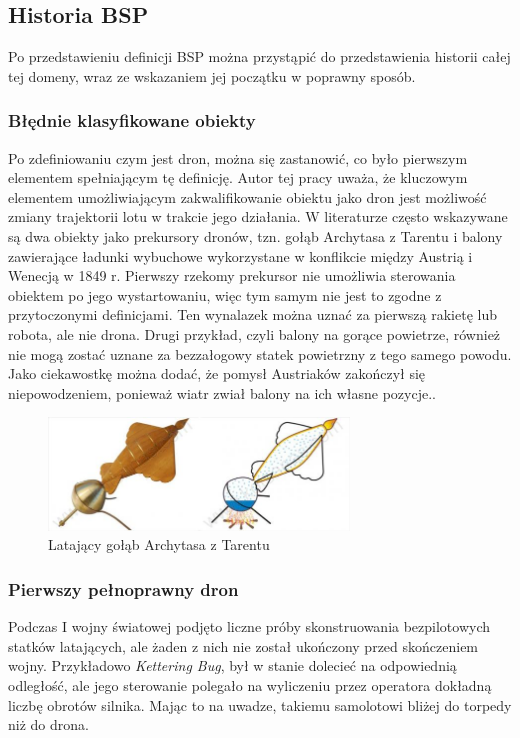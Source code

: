 \subsection{Historia BSP}
Po przedstawieniu definicji BSP można przystąpić do przedstawienia historii całej tej domeny, wraz ze wskazaniem jej początku w poprawny sposób.

\subsubsection{Błędnie klasyfikowane obiekty}
Po zdefiniowaniu czym jest dron, można się zastanowić, co było pierwszym elementem spełniającym tę definicję. Autor tej pracy uważa, że kluczowym elementem umożliwiającym zakwalifikowanie obiektu jako dron jest możliwość zmiany trajektorii lotu w trakcie jego działania. W literaturze często wskazywane są dwa obiekty jako prekursory dronów, tzn. gołąb Archytasa z Tarentu i balony zawierające ładunki wybuchowe wykorzystane w konflikcie między Austrią i Wenecją w 1849 r. Pierwszy rzekomy prekursor nie umożliwia sterowania obiektem po jego wystartowaniu, więc tym samym nie jest to zgodne z przytoczonymi definicjami. Ten wynalazek można uznać za pierwszą rakietę lub robota, ale nie drona. Drugi przykład, czyli balony na gorące powietrze, również nie mogą zostać uznane za bezzałogowy statek powietrzny z tego samego powodu. Jako ciekawostkę można dodać, że pomysł Austriaków zakończył się niepowodzeniem, ponieważ wiatr zwiał balony na ich własne pozycje.\cite{dron-ibuk}. 


\begin{figure}[!ht]
\begin{center}
  \includegraphics[width=8cm]{./Obrazy/golab.jpg}
  \caption{Latający gołąb Archytasa z Tarentu}
\end{center}
\end{figure}

\subsubsection{Pierwszy pełnoprawny dron}
Podczas I wojny światowej podjęto liczne próby skonstruowania bezpilotowych statków latających, ale żaden z nich nie został ukończony przed skończeniem wojny. Przykładowo \textit{Kettering Bug}, był w stanie dolecieć na odpowiednią odległość, ale jego sterowanie polegało na wyliczeniu przez operatora dokładną liczbę obrotów silnika. Mając to na uwadze, takiemu samolotowi bliżej do torpedy niż do drona. 

